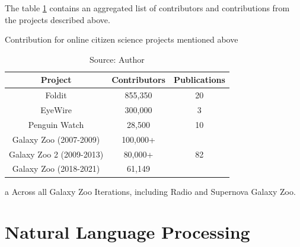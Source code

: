 The table \ref{tab:cs-contributions} contains an aggregated list of contributors and contributions from the projects described above.

\begin{table}[ht]
\centering
\caption{Contribution for online citizen science projects mentioned above}
\label{tab:cs-contributions}
\begin{threeparttable}
    \small{
    \begin{tabular}{|c|c|c|}
        \hline 
        Project & Contributors & Publications \\ \hline
        Foldit & 855,350 \cite{foldit2021players} & 20 \cite{foldit2021publications} \\ \hline
        EyeWire & 300,000 \cite{eyewire2017players} & 3 \cite{eyewire2021publications} \\ \hline
        Penguin Watch & 28,500 \cite{penguin2021players} & 10 \cite{penguin2021publications} \\ \hline
        Galaxy Zoo (2007-2009) & 100,000+ \cite{lintott2011galaxy} & \multirow{3}{*}{82 \cite{galaxyzoo2021publications}\tnote{~a}} \\ \cline{1-2} 
        Galaxy Zoo 2 (2009-2013) & 80,000+ \cite{galaxyzoo22021volunteers} & \\ \cline{1-2} 
        Galaxy Zoo (2018-2021) & 61,149 \cite{galaxyzoo2021players} & \\ \hline 
    \end{tabular}}
    \begin{tablenotes}
        \item[a] Across all Galaxy Zoo Iterations, including Radio and Supernova Galaxy Zoo.
    \end{tablenotes}
\end{threeparttable}
\caption*{Source: Author}
\end{table}

\section{Natural Language Processing}

